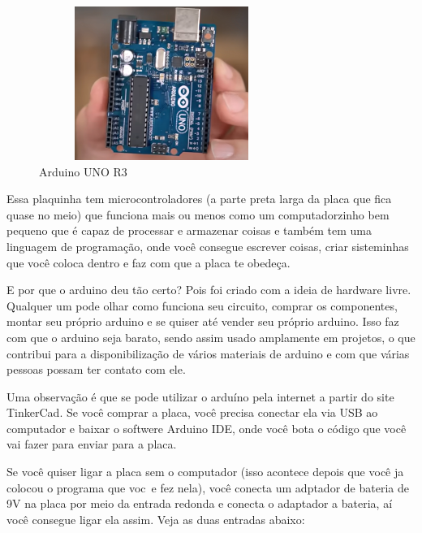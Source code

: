 \documentclass{report}
\begin{document}
	\begin{figure}[ht]
		\centering
		\includegraphics[width=8cm,height=5cm,keepaspectratio=false]{imagens/arduino.png}
		
		\caption{Arduino UNO R3}
		
	\end{figure}
	
	Essa plaquinha tem microcontroladores (a parte preta larga da placa que fica quase no meio) que funciona mais ou menos como um computadorzinho bem pequeno que é capaz de processar e armazenar coisas e também tem uma linguagem de programação, onde você consegue escrever coisas, criar sisteminhas que você coloca dentro e faz com que a placa te obedeça.
	
	E por que o arduino deu tão certo? Pois foi criado com a ideia de hardware livre. Qualquer um pode olhar como funciona seu circuito, comprar os componentes, montar seu próprio arduino e se quiser até vender seu próprio arduino. Isso faz com que o arduino seja barato, sendo assim usado amplamente em projetos, o que contribui para a disponibilização de vários materiais de arduino e com que várias pessoas possam ter contato com ele.
	
	Uma observação é que se pode utilizar o arduíno pela internet a partir do site TinkerCad. Se você comprar a placa, você precisa conectar ela via USB ao computador e baixar o softwere Arduino IDE, onde você bota o código que você vai fazer para enviar para a placa.
	
	Se você quiser ligar a placa sem o computador (isso acontece depois que você ja colocou o programa que voc~e fez nela), você conecta um adptador de bateria de 9V na placa por meio da entrada redonda e conecta o adaptador a bateria, aí você consegue ligar ela assim. Veja as duas entradas abaixo:
	
\end{document}
